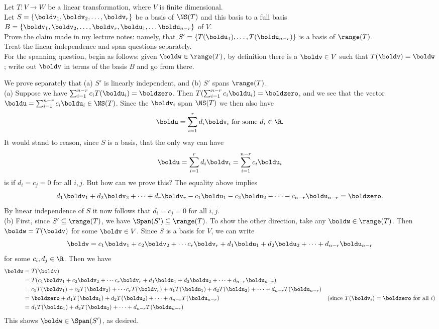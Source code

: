 \ii Let $T\colon V\rightarrow W$ be a linear transformation, where $V$ is finite dimensional.\\
Let $S=\{\boldv_1,\boldv_2,\dots, \boldv_r\}$ be a basis of $\NS(T)$ and this basis to a full basis $B=\{\boldv_1,\boldv_2,\dots, \boldv_r, \boldu_{1},\dots \boldu_{n-r}\}$ of $V$. 
\\
Prove the claim made in my lecture notes: namely, that  $S'=\{T(\boldu_{1}),\dots, T(\boldu_{n-r})\}$ is a basis of $\range(T)$.
\\
Treat the linear independence and span questions separately. \\
For the spanning question, begin as follows: given $\boldw\in \range(T)$, by definition there is a $\boldv\in V$ such that $T(\boldv)=\boldw$; write out $\boldv$ in terms of the basis $B$ and go from there. 
\begin{solution}
\noindent We prove separately that (a) $S'$ is linearly independent, and (b) $S'$ spans $\range(T)$. 
\\
(a) Suppose we have $\sum_{i=1}^{n-r}c_iT(\boldu_i)=\boldzero$. Then $T(\sum_{i=1}^{n-r}c_i\boldu_i)=\boldzero$, and we see that the vector $\boldu=\sum_{i=1}^{n-r}c_i\boldu_i\in\NS(T)$. Since the $\boldv_i$ span $\NS(T)$ we then also have 
\[
\boldu=\sum_{i=1}^rd_i\boldv_i \text{ for some $d_i\in\R$}.
\]
It would stand to reason, since $S$ is a basis, that the only way can have 
\[
\boldu=\sum_{i=1}^rd_i\boldv_i=\sum_{i=1}^{n-r}c_i\boldu_i
\]
is if $d_i=c_j=0$ for all $i, j$. But how can we prove this? The equality above implies 
\[
d_1\boldv_1+d_2\boldv_2+\cdots +d_r\boldv_r-c_1\boldu_1-c_2\boldu_2-\cdots -c_{n-r}\boldu_{n-r}=\boldzero.
\]
By linear independence of $S$ it now follows that $d_i=c_j=0$ for all $i, j$. 
\\
(b) First, since $S'\subseteq \range(T)$, we have $\Span(S')\subseteq \range(T)$. To show the other direction, take any $\boldw\in \range(T)$. Then $\boldw=T(\boldv)$ for some $\boldv\in V$. Since $S$ is a basis for $V$, we can write 
\[
\boldv=c_1\boldv_1+c_2\boldv_2+\cdots c_r\boldv_r+d_1\boldu_1+d_2\boldu_2+\cdots +d_{n-r}\boldu_{n-r}
\]
for some $c_i, d_j\in\R$. Then we have 
\begin{align*}
\boldw&=T(\boldv)\\
&=T(c_1\boldv_1+c_2\boldv_2+\cdots c_r\boldv_r+d_1\boldu_1+d_2\boldu_2+\cdots +d_{n-r}\boldu_{n-r})\\
&=c_1T(\boldv_1)+c_2T(\boldv_2)+\cdots c_rT(\boldv_r)+d_1T(\boldu_1)+d_2T(\boldu_2)+\cdots +d_{n-r}T(\boldu_{n-r})\\
&=\boldzero+d_1T(\boldu_1)+d_2T(\boldu_2)+\cdots +d_{n-r}T(\boldu_{n-r})  &\text{(since $T(\boldv_i)=\boldzero$ for all $i$)}\\
&=d_1T(\boldu_1)+d_2T(\boldu_2)+\cdots +d_{n-r}T(\boldu_{n-r})
\end{align*}
This shows $\boldw\in \Span(S')$, as desired. 
\end{solution} 
